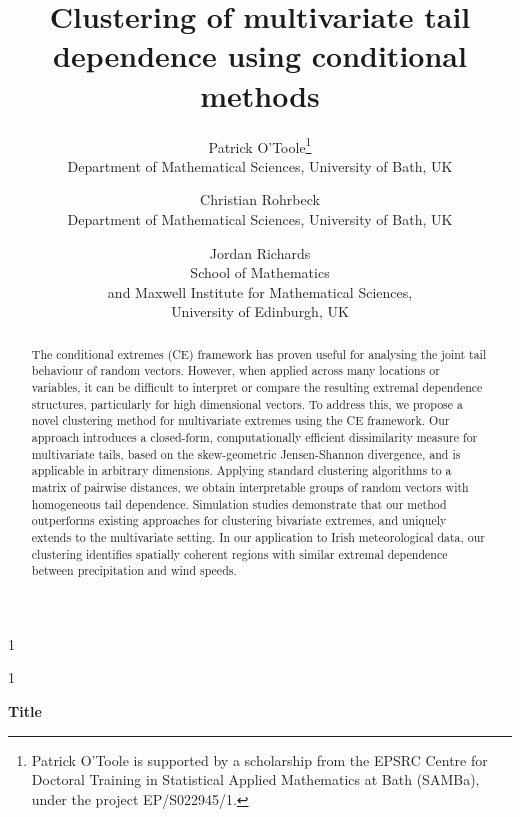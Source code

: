 \documentclass[12pt,compact]{article}
\newcommand{\blind}{1}
\begin{document}
\def\spacingset#1{\renewcommand{\baselinestretch}%
{#1}\small\normalsize} \spacingset{1}


\blind
{
  \title{\bf Clustering of multivariate tail dependence using conditional methods}
  \author{%
  Patrick O'Toole\thanks{Patrick O'Toole is supported by a scholarship from the EPSRC Centre for Doctoral Training in Statistical Applied Mathematics at Bath (SAMBa), under the project EP/S022945/1.}\\
  Department of Mathematical Sciences, University of Bath, UK
  \and
  Christian Rohrbeck\\
  Department of Mathematical Sciences, University of Bath, UK 
  \and
  Jordan Richards\\
  School of Mathematics \\
  and Maxwell Institute for Mathematical Sciences, \\
  University of Edinburgh, UK
  }
  \maketitle
} \fi

\blind
{
  \begin{center}
    {\LARGE\bf Title}
\end{center}
  \medskip
} \fi


\begin{abstract}
  The conditional extremes (CE) framework has proven useful for analysing the joint tail behaviour of random vectors.
  However, when applied across many locations or variables, it can be difficult to interpret or compare the resulting extremal dependence structures, particularly for high dimensional vectors. 
  To address this, we propose a novel clustering method for multivariate extremes using the CE framework.
  Our approach introduces a closed-form, computationally efficient dissimilarity measure for multivariate tails, based on the skew-geometric Jensen-Shannon divergence, and is applicable in arbitrary dimensions.
  Applying standard clustering algorithms to a matrix of pairwise distances, we obtain interpretable groups of random vectors with homogeneous tail dependence.
  Simulation studies demonstrate that our method outperforms existing approaches for clustering bivariate extremes, and uniquely extends to the multivariate setting. 
  In our application to Irish meteorological data, our clustering identifies spatially coherent regions with similar extremal dependence between precipitation and wind speeds. 
\end{abstract}
\end{document}
